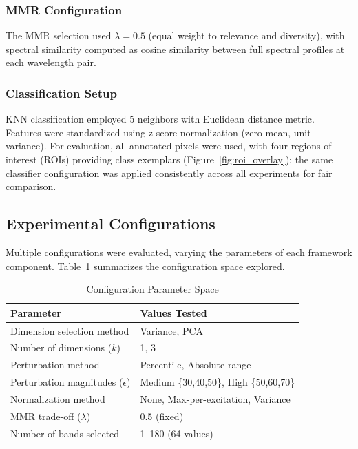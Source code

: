 \subsubsection{MMR Configuration}
The MMR selection used $\lambda = 0.5$ (equal weight to relevance and diversity), with spectral similarity computed as cosine similarity between full spectral profiles at each wavelength pair.

\subsubsection{Classification Setup}
KNN classification employed 5 neighbors with Euclidean distance metric.
Features were standardized using z-score normalization (zero mean, unit variance).
For evaluation, all annotated pixels were used, with four regions of interest (ROIs) providing class exemplars (Figure~\ref{fig:roi_overlay}); the same classifier configuration was applied consistently across all experiments for fair comparison.

\subsection{Experimental Configurations}
\label{sec:configurations}

Multiple configurations were evaluated, varying the parameters of each framework component.
Table~\ref{tab:configs} summarizes the configuration space explored.

\begin{table}[!t]
\centering
\caption{Configuration Parameter Space}
\label{tab:configs}
\begin{tabular}{@{}ll@{}}
\toprule
\textbf{Parameter} & \textbf{Values Tested} \\
\midrule
Dimension selection method & Variance, PCA \\
Number of dimensions ($k$) & 1, 3 \\
Perturbation method & Percentile, Absolute range \\
Perturbation magnitudes ($\epsilon$) & Medium \{30,40,50\}, High \{50,60,70\} \\
Normalization method & None, Max-per-excitation, Variance \\
MMR trade-off ($\lambda$) & 0.5 (fixed) \\
Number of bands selected & 1--180 (64 values) \\
\bottomrule
\end{tabular}
\end{table}

